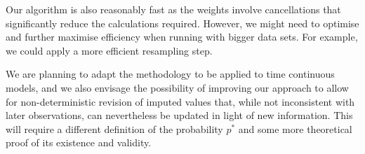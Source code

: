 Our algorithm is also reasonably fast as the weights involve cancellations that significantly reduce the calculations required. However, we might need to optimise and further maximise efficiency when running with bigger data sets. For example, we could apply a more efficient resampling step.

We are planning to adapt the methodology to be applied to time continuous models, and we also envisage the possibility of improving our approach to allow for non-deterministic revision of imputed values that, while not inconsistent with later observations, can nevertheless be updated in light of new information. This will require a different definition of the probability $p^*$ and some more theoretical proof of its existence and validity. 


